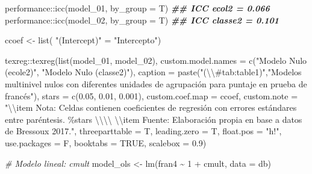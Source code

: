 \documentclass[
  12pt,
  a4paper,
]{article}
\newenvironment{Shaded}{\begin{snugshade}}{\end{snugshade}}
\newcommand{\AttributeTok}[1]{\textcolor[rgb]{0.77,0.63,0.00}{#1}}
\newcommand{\CommentTok}[1]{\textcolor[rgb]{0.56,0.35,0.01}{\textit{#1}}}
\newcommand{\ConstantTok}[1]{\textcolor[rgb]{0.00,0.00,0.00}{#1}}
\newcommand{\DecValTok}[1]{\textcolor[rgb]{0.00,0.00,0.81}{#1}}
\newcommand{\DocumentationTok}[1]{\textcolor[rgb]{0.56,0.35,0.01}{\textbf{\textit{#1}}}}
\newcommand{\FloatTok}[1]{\textcolor[rgb]{0.00,0.00,0.81}{#1}}
\newcommand{\FunctionTok}[1]{\textcolor[rgb]{0.00,0.00,0.00}{#1}}
\newcommand{\NormalTok}[1]{#1}
\newcommand{\OtherTok}[1]{\textcolor[rgb]{0.56,0.35,0.01}{#1}}
\newcommand{\SpecialCharTok}[1]{\textcolor[rgb]{0.00,0.00,0.00}{#1}}
\newcommand{\StringTok}[1]{\textcolor[rgb]{0.31,0.60,0.02}{#1}}
\begin{document}
\begin{Shaded}
\begin{Highlighting}[]
\NormalTok{performance}\SpecialCharTok{::}\FunctionTok{icc}\NormalTok{(model\_01, }\AttributeTok{by\_group =}\NormalTok{ T)}
\DocumentationTok{\#\# ICC ecol2 = 0.066}
\NormalTok{performance}\SpecialCharTok{::}\FunctionTok{icc}\NormalTok{(model\_02, }\AttributeTok{by\_group =}\NormalTok{ T)}
\DocumentationTok{\#\# ICC classe2 = 0.101}

\NormalTok{ccoef }\OtherTok{\textless{}{-}} \FunctionTok{list}\NormalTok{(}
  \StringTok{"(Intercept)"} \OtherTok{=} \StringTok{"Intercepto"}\NormalTok{)}

\NormalTok{texreg}\SpecialCharTok{::}\FunctionTok{texreg}\NormalTok{(}\FunctionTok{list}\NormalTok{(model\_01, model\_02),}
               \AttributeTok{custom.model.names =} \FunctionTok{c}\NormalTok{(}\StringTok{"Modelo Nulo (ecole2)"}\NormalTok{,}
                                      \StringTok{"Modelo Nulo (classe2)"}\NormalTok{),}
               \AttributeTok{caption =} \FunctionTok{paste}\NormalTok{(}\StringTok{"(}\SpecialCharTok{\textbackslash{}\textbackslash{}}\StringTok{\#tab:table1)"}\NormalTok{,}\StringTok{"Modelos multinivel nulos con diferentes unidades de agrupación para puntaje en prueba de francés"}\NormalTok{),}
               \AttributeTok{stars =} \FunctionTok{c}\NormalTok{(}\FloatTok{0.05}\NormalTok{, }\FloatTok{0.01}\NormalTok{, }\FloatTok{0.001}\NormalTok{),}
               \AttributeTok{custom.coef.map =}\NormalTok{ ccoef,}
               \AttributeTok{custom.note =} \StringTok{"}\SpecialCharTok{\textbackslash{}\textbackslash{}}\StringTok{item Nota: Celdas contienen coeficientes de regresión con errores estándares entre paréntesis. \%stars }\SpecialCharTok{\textbackslash{}\textbackslash{}\textbackslash{}\textbackslash{}}\StringTok{ }\SpecialCharTok{\textbackslash{}\textbackslash{}}\StringTok{item Fuente: Elaboración propia en base a datos de Bressoux 2017."}\NormalTok{,}
               \AttributeTok{threeparttable =}\NormalTok{ T,}
               \AttributeTok{leading.zero =}\NormalTok{ T,}
               \AttributeTok{float.pos =} \StringTok{"h!"}\NormalTok{,}
               \AttributeTok{use.packages =}\NormalTok{ F,}
               \AttributeTok{booktabs =} \ConstantTok{TRUE}\NormalTok{,}
               \AttributeTok{scalebox =} \FloatTok{0.9}\NormalTok{)}


\CommentTok{\# Modelo lineal: cmult}
\NormalTok{model\_ols }\OtherTok{\textless{}{-}} \FunctionTok{lm}\NormalTok{(fran4 }\SpecialCharTok{\textasciitilde{}} \DecValTok{1} \SpecialCharTok{+}\NormalTok{ cmult, }\AttributeTok{data =}\NormalTok{ db)}


\end{Highlighting}
\end{Shaded}
\end{document}
